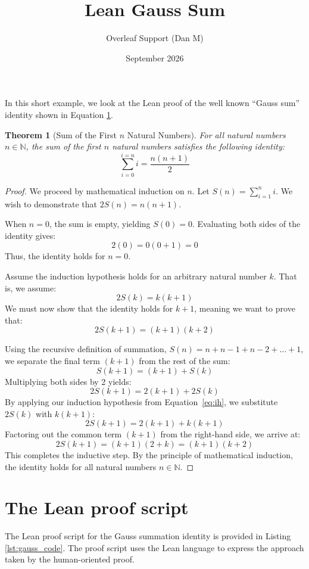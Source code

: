 \documentclass{article}
\title{Lean Gauss Sum}
\author{Overleaf Support (Dan M)}
\date{September 2026}
\newtheorem{theorem}{Theorem}
\begin{document}
\maketitle


In this short example, we look at the Lean proof of the well known ``Gauss sum'' identity shown in Equation \ref{eq:gauss}.

\begin{theorem}[Sum of the First $n$ Natural Numbers]
For all natural numbers $n \in \mathbb{N}$, the sum of the first $n$ natural numbers satisfies the following identity:
\begin{equation}
    \sum_{i=0}^{i=n}i = \frac{n(n+1)}{2}
\end{equation}
\label{eq:gauss}
\end{theorem}

\begin{proof}
We proceed by mathematical induction on $n$. Let $S(n) = \sum_{i=1}^{n} i$. We wish to demonstrate that $2S(n) = n(n+1)$.

When $n = 0$, the sum is empty, yielding $S(0) = 0$. Evaluating both sides of the identity gives:
\[ 2(0) = 0(0 + 1) = 0 \]
Thus, the identity holds for $n=0$.

Assume the induction hypothesis holds for an arbitrary natural number $k$. That is, we assume:
\begin{equation}\label{eq:ih}
2S(k) = k(k + 1)
\end{equation}
We must now show that the identity holds for $k + 1$, meaning we want to prove that:
\[ 2S(k + 1) = (k + 1)(k + 2) \]

Using the recursive definition of summation, $S(n) = n + n-1 + n-2 + \ldots + 1$, we separate the final term $(k + 1)$ from the rest of the sum:
\[ S(k + 1) = (k + 1) + S(k) \]
Multiplying both sides by 2 yields:
\[ 2S(k + 1) = 2(k + 1) + 2S(k) \]
By applying our induction hypothesis from Equation~\eqref{eq:ih}, we substitute $2S(k)$ with $k(k + 1)$:
\[ 2S(k + 1) = 2(k + 1) + k(k + 1) \]
Factoring out the common term $(k + 1)$ from the right-hand side, we arrive at:
\[ 2S(k + 1) = (k + 1)(2 + k) = (k + 1)(k + 2) \]
This completes the inductive step. By the principle of mathematical induction, the identity holds for all natural numbers $n \in \mathbb{N}$.
\end{proof}

\section{The Lean proof script}
The Lean proof script for the Gauss summation identity is provided in Listing \ref{lst:gauss_code}. The proof script uses the Lean language to express the approach taken by the human-oriented proof. 
\end{document}
